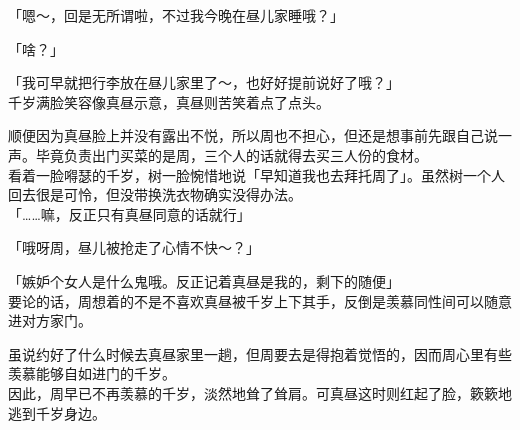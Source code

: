 「嗯～，回是无所谓啦，不过我今晚在昼儿家睡哦？」

「啥？」

「我可早就把行李放在昼儿家里了～，也好好提前说好了哦？」\\

千岁满脸笑容像真昼示意，真昼则苦笑着点了点头。

顺便因为真昼脸上并没有露出不悦，所以周也不担心，但还是想事前先跟自己说一声。毕竟负责出门买菜的是周，三个人的话就得去买三人份的食材。\\

看着一脸嘚瑟的千岁，树一脸惋惜地说「早知道我也去拜托周了」。虽然树一个人回去很是可怜，但没带换洗衣物确实没得办法。\\

「……嘛，反正只有真昼同意的话就行」

「哦呀周，昼儿被抢走了心情不快～？」

「嫉妒个女人是什么鬼哦。反正记着真昼是我的，剩下的随便」\\

要论的话，周想着的不是不喜欢真昼被千岁上下其手，反倒是羡慕同性间可以随意进对方家门。

虽说约好了什么时候去真昼家里一趟，但周要去是得抱着觉悟的，因而周心里有些羡慕能够自如进门的千岁。\\

因此，周早已不再羡慕的千岁，淡然地耸了耸肩。可真昼这时则红起了脸，簌簌地逃到千岁身边。\\

